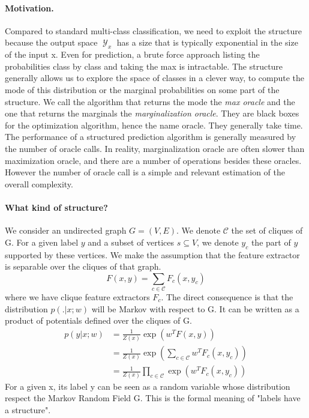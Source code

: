 \documentclass{article}
\DeclareMathOperator{\1}{\mathbb{1}}
\DeclareMathOperator{\Y}{\mathcal{Y}}
\begin{document}
\paragraph{Motivation.}
Compared to standard multi-class classification, we need to exploit the structure because the output space $\Y_x$ has a size that is typically exponential in the size of the input x.
Even for prediction, a brute force approach listing the probabilities class by class and taking the max is intractable.
The structure generally allows us to explore the space of classes in a clever way, to compute the mode of this distribution or the marginal probabilities on some part of the structure.
We call the algorithm that returns the mode the \textit{max oracle} and the one that returns the marginals the \textit{marginalization oracle}.
They are black boxes for the optimization algorithm, hence the name oracle.
They generally take time.
The performance of a structured prediction algorithm is generally measured by the number of oracle calls.
In reality, marginalization oracle are often slower than maximization oracle, and there are a number of operations besides these oracles.
However the number of oracle call is a simple and relevant estimation of the overall complexity.

\paragraph{What kind of structure?}
We consider an undirected graph $G=(V,E)$.
We denote $\mathcal{C}$ the set of cliques of G.
For a given label $y$ and a subset of vertices $s \subseteq V$, we denote $y_c$ the part of $y$ supported by these vertices.
We make the assumption that the feature extractor is separable over the cliques of that graph.
\begin{equation}
	F(x, y) =  \sum_{c\in \mathcal{C}} F_c(x, y_c)
\end{equation}
where we have clique feature extractors $F_c$.
The direct consequence is that the distribution $p(. | x ; w)$ will be Markov with respect to G.
It can be written as a product of potentials defined over the cliques of G.
\begin{align*}
	p(y|x ; w)
	& = \frac{1}{Z(x)} \exp(w^TF(x, y)) \\
	& = \frac{1}{Z(x)} \exp( \sum_{c \in \mathcal{C}} w^T F_c(x, y_c))\\
	& = \frac{1}{Z(x)} \prod_{c \in \mathcal{C}} \exp(w^TF_c(x, y_c))
\end{align*}
For a given x, its label y can be seen as a random variable whose distribution respect the Markov Random Field G.
This is the formal meaning of "labels have a structure".
\end{document}
